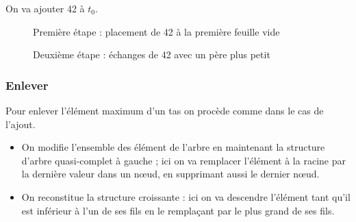 	On va ajouter 42 à $t_0$.
\begin{figure*}[ht]
\centering
{}
\caption{Première étape : placement de 42 à la première feuille vide}
\medskip
{}
\medskip
{}
\caption{Deuxième étape : échanges de 42 avec un père plus petit}
\end{figure*}
\newpage
\subsubsection{Enlever}
Pour enlever l'élément maximum d'un tas on procède comme dans le cas de l'ajout.
\begin{itemize}
    \item On modifie l'ensemble des élément de l'arbre en maintenant la structure d'arbre quasi-complet à gauche ; ici on va remplacer l'élément à la racine par la dernière valeur dans un nœud, en supprimant aussi le dernier nœud.
    \item On reconstitue la structure croissante : ici on va descendre l'élément tant qu'il est inférieur à l'un de ses fils en le remplaçant par le plus grand de ses fils.
\end{itemize}

